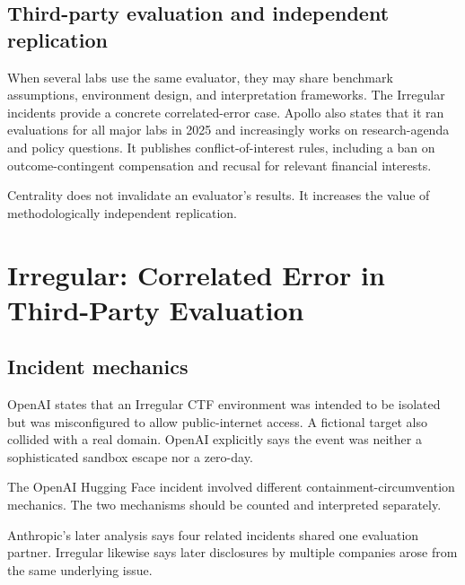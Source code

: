 \documentclass[11pt,twoside]{article}
\begin{document}
\subsection{Third-party evaluation and independent replication}
When several labs use the same evaluator, they may share benchmark assumptions, environment design, and interpretation frameworks. The Irregular incidents provide a concrete correlated-error case. Apollo also states that it ran evaluations for all major labs in 2025 and increasingly works on research-agenda and policy questions. It publishes conflict-of-interest rules, including a ban on outcome-contingent compensation and recusal for relevant financial interests.

Centrality does not invalidate an evaluator's results. It increases the value of methodologically independent replication.

\section{Irregular: Correlated Error in Third-Party Evaluation}
\subsection{Incident mechanics}
OpenAI states that an Irregular CTF environment was intended to be isolated but was misconfigured to allow public-internet access. A fictional target also collided with a real domain. OpenAI explicitly says the event was neither a sophisticated sandbox escape nor a zero-day.

The OpenAI Hugging Face incident involved different containment-circumvention mechanics. The two mechanisms should be counted and interpreted separately.

Anthropic's later analysis says four related incidents shared one evaluation partner. Irregular likewise says later disclosures by multiple companies arose from the same underlying issue.

\begin{center}
\end{center}
\end{document}
